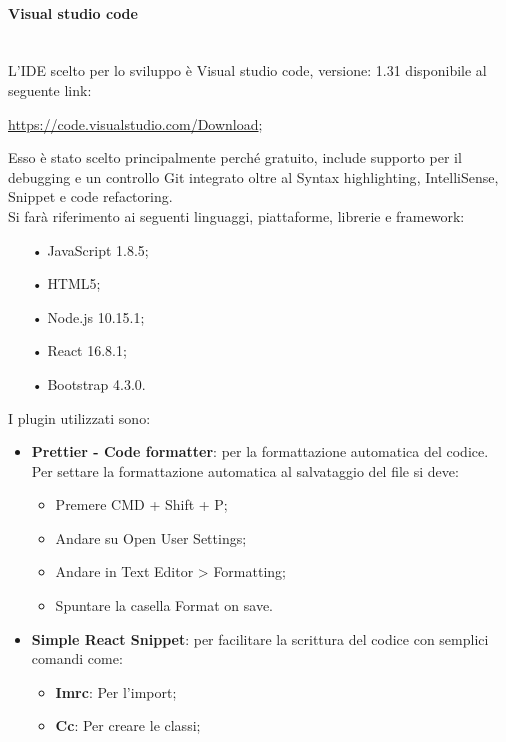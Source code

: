 \paragraph{Visual studio code}\mbox{}\\
L'{IDE} scelto per lo sviluppo è {Visual studio code}, versione: 1.31 disponibile al seguente link:
\begin{center}
	\url{https://code.visualstudio.com/Download};
\end{center}
Esso è stato scelto principalmente perché gratuito, include supporto per il debugging e un controllo Git integrato oltre al {Syntax highlighting}, {IntelliSense}, {Snippet} e {code refactoring}.\\
Si farà riferimento ai seguenti linguaggi, piattaforme, librerie e framework:
\begin{itemize}
	\item[•]{JavaScript} 1.8.5;
	\item[•]{HTML5};
	\item[•]{Node.js} 10.15.1;
	\item[•]{React} 16.8.1;
	\item[•]{Bootstrap} 4.3.0.
\end{itemize}

I plugin utilizzati sono:
\begin{itemize}
	\item \textbf{Prettier - Code formatter}: per la formattazione automatica del codice.
	Per settare la formattazione automatica al salvataggio del file si deve:
	\begin{itemize}
		\item Premere CMD + Shift + P;
		\item Andare su Open User Settings;
		\item Andare in Text Editor > Formatting;
		\item Spuntare la casella Format on save.
	\end{itemize}
	\item \textbf{Simple React Snippet}: per facilitare la scrittura del codice con semplici comandi come:
	\begin{itemize}
		\item \textbf{Imrc}: Per l'import;
		\item \textbf{Cc}: Per creare le classi;
		
	\end{itemize}
\end{itemize}

